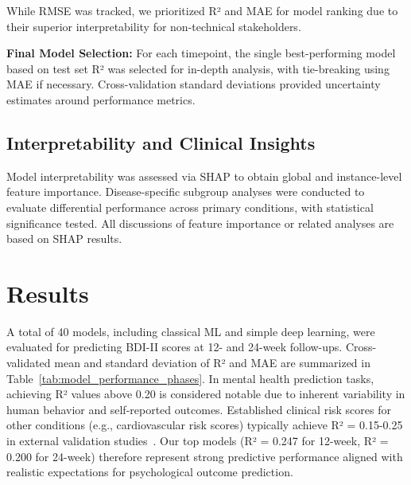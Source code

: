 \documentclass[conference]{IEEEtran}
\begin{document}
While RMSE was tracked, we prioritized R² and MAE for model ranking due to their superior interpretability for non-technical stakeholders.

\textbf{Final Model Selection:} For each timepoint, the single best-performing model based on test set R² was selected for in-depth analysis, with tie-breaking using MAE if necessary. Cross-validation standard deviations provided uncertainty estimates around performance metrics.

\subsection{Interpretability and Clinical Insights}

Model interpretability was assessed via SHAP to obtain global and instance-level feature importance. Disease-specific subgroup analyses were conducted to evaluate differential performance across primary conditions, with statistical significance tested. All discussions of feature importance or related analyses are based on SHAP results.


\section{Results}

A total of 40 models, including classical ML and simple deep learning, were evaluated for predicting BDI-II scores at 12- and 24-week follow-ups. Cross-validated mean and standard deviation of R² and MAE are summarized in Table~\ref{tab:model_performance_phases}. 
In mental health prediction tasks, achieving R² values above 0.20 is considered notable due to inherent variability in human behavior and self-reported outcomes. Established clinical risk scores for other conditions (e.g., cardiovascular risk scores) typically achieve R² = 0.15-0.25 in external validation studies~\cite{b6, b7, b8}. Our top models (R² = 0.247 for 12-week, R² = 0.200 for 24-week) therefore represent strong predictive performance aligned with realistic expectations for psychological outcome prediction.
\end{document}
